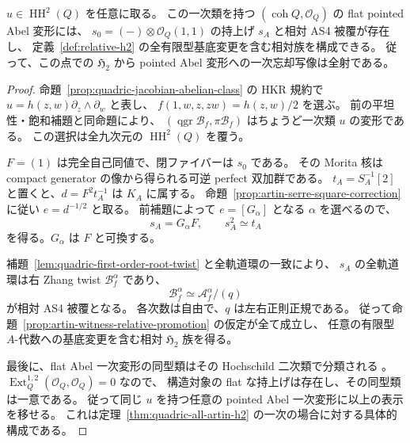 \begin{theorem}
\label{thm:quadric-all-first-order-h2}
$u\in\operatorname{HH}^2(Q)$ を任意に取る。
この一次類を持つ $(\operatorname{coh}Q,\mathcal O_Q)$ の flat pointed Abel 変形には、
$s_0=(-)\otimes\mathcal O_Q(1,1)$ の持上げ $s_A$ と相対 AS4 被覆が存在し、
定義~\ref{def:relative-h2} の全有限型基底変更を含む相対族を構成できる。
従って、この点での $\mathfrak H_2$ から pointed Abel 変形への一次忘却写像は全射である。
\end{theorem}
\begin{proof}
命題~\ref{prop:quadric-jacobian-abelian-class} の HKR 規約で
$u=h(z,w)\partial_z\wedge\partial_w$ と表し、
$f(1,w,z,zw)=h(z,w)/2$ を選ぶ。
前の平坦性・飽和補題と同命題により、
$(\operatorname{qgr}\mathcal B_f,\pi\mathcal B_f)$ はちょうど一次類 $u$ の変形である。
この選択は全九次元の $\operatorname{HH}^2(Q)$ を覆う。

$F=(1)$ は完全自己同値で、閉ファイバーは $s_0$ である。
その Morita 核は compact generator の像から得られる可逆 perfect 双加群である。
$t_A=S_A^{-1}[2]$ と置くと、$d=F^2t_A^{-1}$ は $K_A$ に属する。
命題~\ref{prop:artin-serre-square-correction} に従い
$e=d^{-1/2}$ と取る。
前補題によって $e=[G_\alpha]$ となる $\alpha$ を選べるので、
\[
 s_A=G_\alpha F,\qquad s_A^2\simeq t_A
\]
を得る。$G_\alpha$ は $F$ と可換する。

補題~\ref{lem:quadric-first-order-root-twist} と全軌道環の一致により、
$s_A$ の全軌道環は右 Zhang twist $\mathcal B_f^\alpha$ であり、
\[
 \mathcal B_f^\alpha\simeq\mathcal A_f^\alpha/(q)
\]
が相対 AS4 被覆となる。
各次数は自由で、$q$ は左右正則正規である。
従って命題~\ref{prop:artin-witness-relative-promotion} の仮定が全て成立し、
任意の有限型 $A$-代数への基底変更を含む相対 $\mathfrak H_2$ 族を得る。

最後に、flat Abel 一次変形の同型類はその Hochschild 二次類で分類される
\cite[Theorem 3.1 and Remark 3.5, author preprint]{LowenVanDenBergh2005}。
$\operatorname{Ext}^{1,2}_Q(\mathcal O_Q,\mathcal O_Q)=0$ なので、
構造対象の flat な持上げは存在し、その同型類は一意である。
従って同じ $u$ を持つ任意の pointed Abel 一次変形に以上の表示を移せる。
これは定理~\ref{thm:quadric-all-artin-h2} の一次の場合に対する具体的構成である。
\end{proof}


